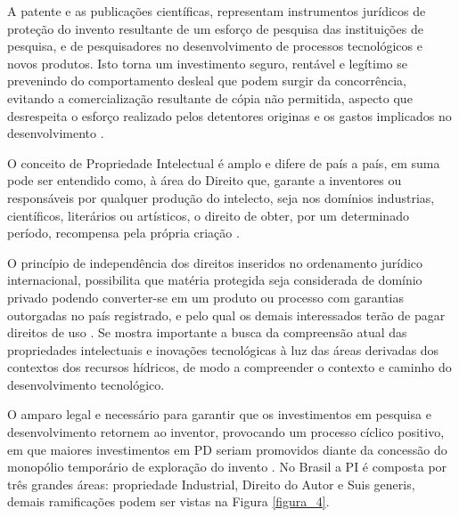 A patente e as publicações científicas, representam instrumentos jurídicos de proteção do invento resultante de um esforço de pesquisa das instituições de pesquisa, e de pesquisadores no desenvolvimento de processos tecnológicos e novos produtos. Isto torna um investimento seguro, rentável e legítimo se prevenindo do comportamento desleal que podem surgir da concorrência, evitando a comercialização resultante de cópia não permitida, aspecto que desrespeita o esforço realizado pelos detentores originas e os gastos implicados no desenvolvimento \cite{marques_natureza_2017}.

O conceito de Propriedade Intelectual é amplo e difere de país a país, em suma pode ser entendido como, à área do Direito que, garante a inventores ou responsáveis por qualquer produção do intelecto, seja nos domínios industrias, científicos, literários ou artísticos, o direito de obter, por um determinado período, recompensa pela própria criação \cite{aspi_propriedade_2018}.

O princípio de independência dos direitos inseridos no ordenamento jurídico internacional, possibilita que matéria protegida seja considerada de domínio privado podendo converter-se em um produto ou processo com garantias outorgadas no país registrado, e pelo qual os demais interessados terão de pagar direitos de uso \cite{galvao_direitos_2002}. Se mostra importante a busca da compreensão atual das propriedades intelectuais e inovações tecnológicas à luz das áreas derivadas dos contextos dos recursos hídricos, de modo a compreender o contexto e caminho do desenvolvimento tecnológico.

O amparo legal e necessário para garantir que os investimentos em pesquisa e desenvolvimento retornem ao inventor, provocando um processo cíclico positivo, em que maiores investimentos em PD seriam promovidos diante da concessão do monopólio temporário de exploração do invento \cite{lima_sauglobal_2017}. No Brasil a PI é composta por três grandes áreas: propriedade Industrial, Direito do Autor e Suis generis, demais ramificações podem ser vistas na Figura \ref{figura_4}.


